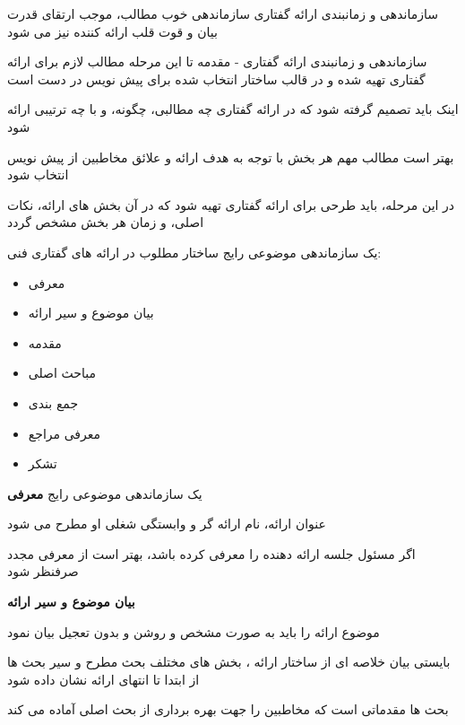 \documentclass[14pt]{beamer}
\makeatletter
\newcommand{\rtlist}{\raggedleft\rightskip\@totalleftmargin}
\newcommand{\framefontsizelarge}{\fontsize{18pt}{0pt}\selectfont}
\newcommand{\frametitlefontsize}{\fontsize{20pt}{0pt}\selectfont}
\makeatother
\begin{document}
\begin{persian}
\begin{frame}[plain]{\frametitlefontsize سازماندهی و زمانبندی ارائه گفتاری}
		سازماندهی خوب مطالب، موجب ارتقای قدرت بیان و قوت قلب ارائه کننده نیز می شود
	\end{frame}	
	
	\begin{frame}[plain]{\frametitlefontsize سازماندهی و زمانبندی ارائه گفتاری - مقدمه}
		\framefontsizelarge
		تا این مرحله مطالب لازم برای ارائه گفتاری تهیه شده و در قالب ساختار انتخاب شده برای پیش نویس در دست است
		
		اینک باید تصمیم گرفته شود که در ارائه گفتاری چه مطالبی، چگونه، و با چه ترتیبی ارائه شود
		
		بهتر است مطالب مهم هر بخش با توجه به هدف ارائه و علائق مخاطبین از پیش نویس انتخاب شود
		
		در این مرحله، باید طرحی برای ارائه گفتاری تهیه شود که در آن بخش های ارائه، نکات اصلی، و زمان هر بخش مشخص گردد
	\end{frame}	
	
	\begin{frame}[plain]{\frametitlefontsize یک سازماندهی موضوعی رایج}
		\framefontsizelarge
		ساختار مطلوب در ارائه های گفتاری فنی:
		\begin{itemize}\rtlist
			\item معرفی
			\item بیان موضوع و سیر ارائه
			\item مقدمه
			\item مباحث اصلی
			\item جمع بندی
			\item معرفی مراجع
			\item تشکر
		\end{itemize}
	\end{frame}		

	\begin{frame}[plain]{\frametitlefontsize یک سازماندهی موضوعی رایج}
		\framefontsizelarge
		\textbf{معرفی}
		
		عنوان ارائه، نام ارائه گر و وابستگی شغلی او مطرح می شود
		
		اگر مسئول جلسه ارائه دهنده را معرفی کرده باشد، بهتر است از معرفی مجدد صرفنظر شود
		
		\textbf{بیان موضوع و سیر ارائه}
		
		موضوع ارائه را باید به صورت مشخص و روشن و بدون تعجیل بیان نمود
		
		بایستی بیان خلاصه ای از ساختار ارائه ، بخش های مختلف بحث مطرح و سیر بحث ها از ابتدا تا انتهای ارائه نشان داده شود
		
		بحث ها مقدماتی است که مخاطبین را جهت بهره برداری از بحث اصلی آماده می
		کند
	\end{frame}		


\end{persian}
\end{document}
